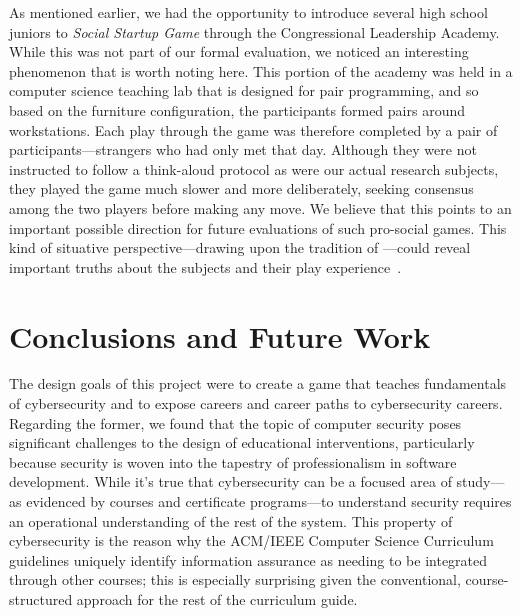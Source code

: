 \documentclass[letterpaper]{article}
\begin{document}
As mentioned earlier, we had the opportunity to introduce several
high school juniors to \textit{Social Startup Game} through the 
Congressional Leadership Academy. While this was not part of our
formal evaluation, we noticed an interesting phenomenon that is worth
noting here. This portion of the academy was held in a computer science
teaching lab that is designed for pair programming, and so based on
the furniture configuration, the participants formed pairs around
workstations. Each play through the game was therefore completed
by a pair of participants---strangers who had only met that day.
Although they were not instructed to follow a think-aloud protocol
as were our actual research subjects, they played the game much
slower and more deliberately, seeking consensus among the two players
before making any move. We believe that this points to an important
possible direction for future evaluations of such pro-social games.
This kind of situative perspective---drawing upon the tradition
of \citet{Wenger1999}---could reveal important truths
about the subjects and their play experience~\citep{Hickey2003}.


\section{Conclusions and Future Work}

The design goals of this project were to create a game that teaches
fundamentals of cybersecurity and to expose careers and career paths
to cybersecurity careers.
Regarding the former, we found that the topic of 
computer security poses significant challenges to the design of
educational interventions, particularly because security is woven
into the tapestry of professionalism in software development.
While it's true that cybersecurity can be a focused area of study---as
evidenced by courses and certificate programs---to understand security
requires an operational understanding of the rest of the system.
This property of cybersecurity is the reason why the ACM/IEEE Computer Science
Curriculum guidelines uniquely identify information assurance as needing
to be integrated through other courses; this is especially surprising given
the conventional, course-structured approach for the rest of the curriculum
guide.
\end{document}
